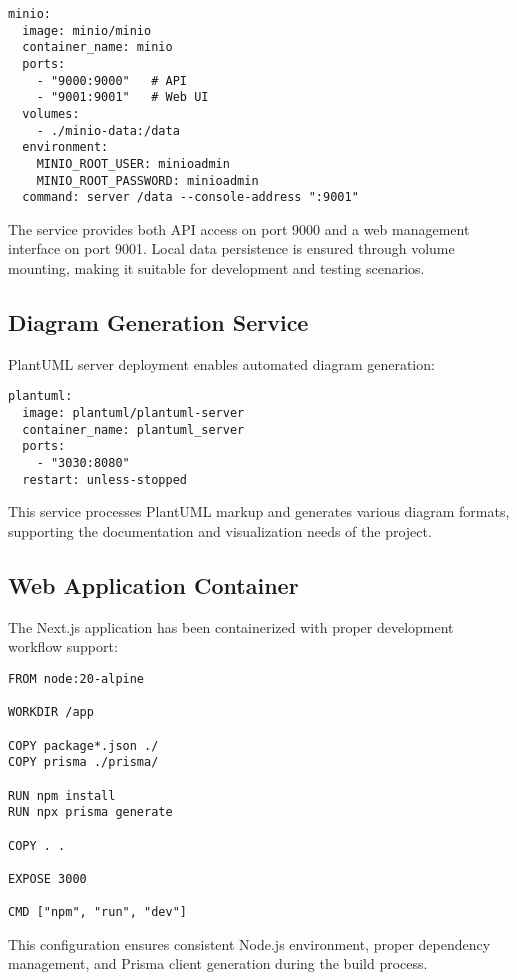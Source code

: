 \begin{verbatim}
minio:
  image: minio/minio
  container_name: minio
  ports:
    - "9000:9000"   # API
    - "9001:9001"   # Web UI
  volumes:
    - ./minio-data:/data
  environment:
    MINIO_ROOT_USER: minioadmin
    MINIO_ROOT_PASSWORD: minioadmin
  command: server /data --console-address ":9001"
\end{verbatim}

The service provides both API access on port 9000 and a web management interface on port 9001. Local data persistence is ensured through volume mounting, making it suitable for development and testing scenarios.

\subsection{Diagram Generation Service}

PlantUML server deployment enables automated diagram generation:

\begin{verbatim}
plantuml:
  image: plantuml/plantuml-server
  container_name: plantuml_server
  ports:
    - "3030:8080"
  restart: unless-stopped
\end{verbatim}

This service processes PlantUML markup and generates various diagram formats, supporting the documentation and visualization needs of the project.

\subsection{Web Application Container}

The Next.js application has been containerized with proper development workflow support:

\begin{verbatim}
FROM node:20-alpine

WORKDIR /app

COPY package*.json ./
COPY prisma ./prisma/

RUN npm install
RUN npx prisma generate

COPY . .

EXPOSE 3000

CMD ["npm", "run", "dev"]
\end{verbatim}

This configuration ensures consistent Node.js environment, proper dependency management, and Prisma client generation during the build process.

